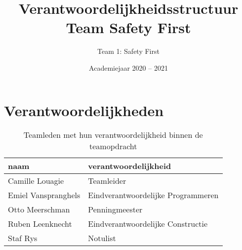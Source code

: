 \documentclass[a4paper,kulak]{kulakarticle} %
\date{Academiejaar 2020 -- 2021}
\title{Verantwoordelijkheidsstructuur Team Safety First}
\author{Team 1: Safety First}
\begin{document}
\maketitle
\section{Verantwoordelijkheden}

\begin{table}[h]
	\caption{Teamleden met hun verantwoordelijkheid binnen de teamopdracht}
	\centering
	\begin{tabular}{l|l}
		naam                &               verantwoordelijkheid \\ 
		\hline
		Camille Louagie     &                         Teamleider \\
		Emiel Vanspranghels & Eindverantwoordelijke Programmeren \\
		Otto Meerschman     &                     Penningmeester \\
		Ruben Leenknecht    &  Eindverantwoordelijke Constructie \\
		Staf Rys            &                           Notulist \\
	\end{tabular}

\end{table}
\end{document}

